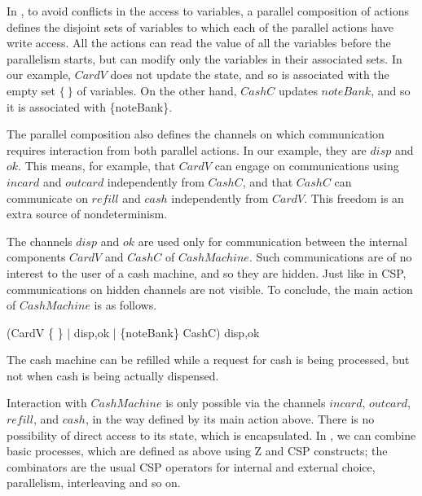 \documentclass{article}
\begin{document}
In \Circus, to avoid conflicts in the access to variables, a parallel
composition of actions defines the disjoint sets of variables to
which each of the parallel actions have write access. All the actions
can read the value of all the variables before the parallelism
starts, but can modify only the variables in their associated sets.
In our example, $CardV$ does not update the state, and so is
associated with the empty set $\{~\}$ of variables.  On the other
hand,  $CashC$ updates $noteBank$, and so it is associated with
\{noteBank\}.

The parallel composition also defines the channels on which
communication requires interaction from both parallel actions.  In
our example, they are $disp$ and $ok$.  This means, for example, that
$CardV$ can engage on communications using $incard$ and $outcard$
independently from $CashC$, and that $CashC$ can communicate on
$refill$ and $cash$ independently from $CardV$.  This freedom is an
extra source of nondeterminism.

The channels $disp$ and $ok$ are used only for communication between
the internal components $CardV$ and $CashC$ of $CashMachine$. Such
communications are of no interest to the user of a cash machine, and
so they are hidden.  Just like in CSP, communications on hidden
channels are not visible.
%
To conclude, the main action of $CashMachine$ is as follows.
\begin{circusaction}
  \circspot (CardV \lpar \{ \} | \lchanset disp,ok \rchanset | \{noteBank\} \rpar CashC) \circhide \lchanset disp,ok \rchanset
\end{circusaction}
\begin{circus}
    \circend
\end{circus}
The cash machine can be refilled while a request for cash is being
processed, but not when cash is being actually dispensed.

Interaction with $CashMachine$ is only possible via the channels
$incard$, $outcard$, $refill$, and $cash$, in the way defined by its
main action above.  There is no possibility of direct access to its
state, which is encapsulated.  In \Circus, we can combine basic
processes, which are defined as above using Z and CSP constructs; the
combinators are the usual CSP operators for internal and external
choice, parallelism, interleaving and so on.
\end{document}

